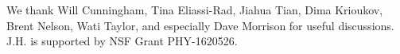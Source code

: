 \documentclass[aps,prl,twocolumn, superscriptaddress,groupedaddress,nofootinbib]{revtex4-1}
\newtheorem{prop}{Proposition}
\newcommand{\XXX}[3]{}
\begin{document}
 We thank Will Cunningham, Tina Eliassi-Rad, Jiahua Tian, Dima Krioukov, Brent Nelson, Wati Taylor,
and especially Dave Morrison for useful discussions. 
J.H. is supported by
NSF Grant PHY-1620526.


\end{document}
